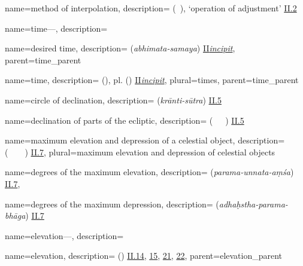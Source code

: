 {
        name={method of interpolation},
        description={ (\amal\idafaconsonant\ \tadil), \lit `operation of adjustment' \hyperlink{Pii2}{II.2}}
}

{
        name={time---},
        description={\phantom{x}\nopagebreak}
}

{
        name={desired time},
        description={ (\textit{abhimata-samaya}) \hyperlink{SiiInc}{II\thinspace\textit{incipit}}},
        parent={time_parent}
}

{
        name={time},
        description={ (\vaqt), pl.\thinspace {} (\avqat) \hyperlink{PiiInc}{II\thinspace\textit{incipit}}},
        plural={times},
        parent={time_parent}
}

{
        name={circle of declination},
        description={ (\textit{krānti-sūtra}) \hyperlink{Sii5}{II.5}}
}        
       

{
        name={declination of parts of the ecliptic},
        description={  (\mayl\idafaconsonant\ \ajza\idafaconsonant\ \falak\ \alburuj) \hyperlink{Pii5}{II.5}}
}

{
        name={maximum elevation and depression of a celestial object},
        description={\newline{} (\ghayat\idafaconsonant\ \irtifa\ \va\ \inkhifad\idafaconsonant\ \kawkab) \hyperlink{Pii7}{II.7}},
        plural={maximum elevation and depression of celestial objects}
}

{
        name={degrees of the maximum elevation},
        description={ (\textit{parama-unnata-aṃśa}) \hyperlink{Sii7}{II.7}},
}        

{
        name={degrees of the maximum depression},
        description={ (\textit{adhaḥstha-parama-bhāga}) \hyperlink{Sii7}{II.7}}
}

{
        name={elevation---},
        description={\phantom{x}\nopagebreak}
}

{
        name={elevation},
        description={ (\irtifa) \hyperlink{Pii14}{II.14}, \hyperlink{Pii15}{15}, \hyperlink{Pii21}{21}, \hyperlink{Pii22}{22}},
        parent={elevation_parent}
}

